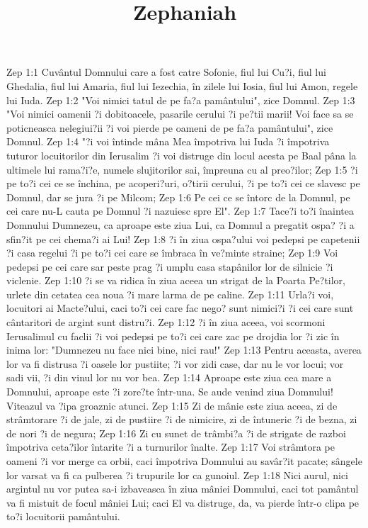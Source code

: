 

\title{Zephaniah}

Zep 1:1  Cuvântul Domnului care a fost catre Sofonie, fiul lui Cu?i, fiul lui Ghedalia, fiul lui Amaria, fiul lui Iezechia, în zilele lui Iosia, fiul lui Amon, regele lui Iuda.
Zep 1:2  "Voi nimici tatul de pe fa?a pamântului", zice Domnul.
Zep 1:3  "Voi nimici oamenii ?i dobitoacele, pasarile cerului ?i pe?tii marii! Voi face sa se poticneasca nelegiui?ii ?i voi pierde pe oameni de pe fa?a pamântului", zice Domnul.
Zep 1:4  "?i voi întinde mâna Mea împotriva lui Iuda ?i împotriva tuturor locuitorilor din Ierusalim ?i voi distruge din locul acesta pe Baal pâna la ultimele lui rama?i?e, numele slujitorilor sai, împreuna cu al preo?ilor;
Zep 1:5  ?i pe to?i cei ce se închina, pe acoperi?uri, o?tirii cerului, ?i pe to?i cei ce slavesc pe Domnul, dar se jura ?i pe Milcom;
Zep 1:6  Pe cei ce se întorc de la Domnul, pe cei care nu-L cauta pe Domnul ?i nazuiesc spre El".
Zep 1:7  Tace?i to?i înaintea Domnului Dumnezeu, ca aproape este ziua Lui, ca Domnul a pregatit ospa? ?i a sfin?it pe cei chema?i ai Lui!
Zep 1:8  ?i în ziua ospa?ului voi pedepsi pe capetenii ?i casa regelui ?i pe to?i cei care se îmbraca în ve?minte straine;
Zep 1:9  Voi pedepsi pe cei care sar peste prag ?i umplu casa stapânilor lor de silnicie ?i viclenie.
Zep 1:10  ?i se va ridica în ziua aceea un strigat de la Poarta Pe?tilor, urlete din cetatea cea noua ?i mare larma de pe caline.
Zep 1:11  Urla?i voi, locuitori ai Macte?ului, caci to?i cei care fac nego? sunt nimici?i ?i cei care sunt cântaritori de argint sunt distru?i.
Zep 1:12  ?i în ziua aceea, voi scormoni Ierusalimul cu faclii ?i voi pedepsi pe to?i cei care zac pe drojdia lor ?i zic în inima lor: "Dumnezeu nu face nici bine, nici rau!"
Zep 1:13  Pentru aceasta, averea lor va fi distrusa ?i oasele lor pustiite; ?i vor zidi case, dar nu le vor locui; vor sadi vii, ?i din vinul lor nu vor bea.
Zep 1:14  Aproape este ziua cea mare a Domnului, aproape este ?i zore?te într-una. Se aude venind ziua Domnului! Viteazul va ?ipa groaznic atunci.
Zep 1:15  Zi de mânie este ziua aceea, zi de strâmtorare ?i de jale, zi de pustiire ?i de nimicire, zi de întuneric ?i de bezna, zi de nori ?i de negura;
Zep 1:16  Zi cu sunet de trâmbi?a ?i de strigate de razboi împotriva ceta?ilor întarite ?i a turnurilor înalte.
Zep 1:17  Voi strâmtora pe oameni ?i vor merge ca orbii, caci împotriva Domnului au savâr?it pacate; sângele lor varsat va fi ca pulberea ?i trupurile lor ca gunoiul.
Zep 1:18  Nici aurul, nici argintul nu vor putea sa-i izbaveasca în ziua mâniei Domnului, caci tot pamântul va fi mistuit de focul mâniei Lui; caci El va distruge, da, va pierde într-o clipa pe to?i locuitorii pamântului.

